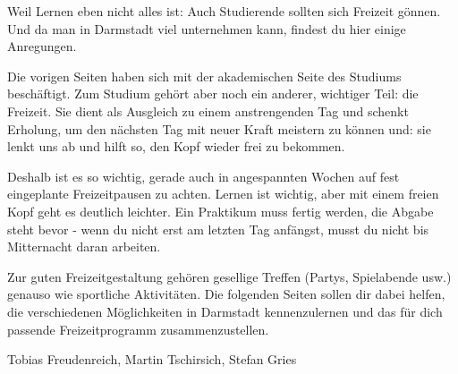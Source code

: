 {Weil Lernen eben nicht alles ist: Auch Studierende sollten sich Freizeit gönnen. Und da man in Darmstadt viel unternehmen kann, findest du hier einige Anregungen.
}{
    Die vorigen Seiten haben sich mit der akademischen Seite des Studiums beschäftigt. Zum Studium gehört aber noch ein anderer, wichtiger Teil: die Freizeit. Sie dient als Ausgleich zu einem anstrengenden Tag und schenkt Erholung, um den nächsten Tag mit neuer Kraft meistern zu können und: sie lenkt uns ab und hilft so, den Kopf wieder frei zu bekommen.

    Deshalb ist es so wichtig, gerade auch in angespannten Wochen auf fest eingeplante Freizeitpausen zu achten. Lernen ist wichtig, aber mit einem freien Kopf geht es deutlich leichter. Ein Praktikum muss fertig werden, die Abgabe steht bevor - wenn du nicht erst am letzten Tag anfängst, musst du nicht bis Mitternacht daran arbeiten.

    Zur guten Freizeitgestaltung gehören gesellige Treffen (Partys, Spielabende usw.) genauso wie sportliche Aktivitäten. Die folgenden Seiten sollen dir dabei helfen, die verschiedenen Möglichkeiten in Darmstadt kennenzulernen und das für dich passende Freizeitprogramm zusammenzustellen.
}
{Tobias Freudenreich, Martin Tschirsich, Stefan Gries}
